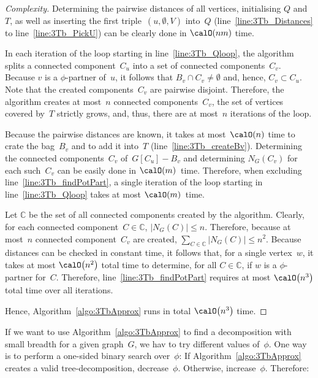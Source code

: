 \begin{proof}
    [Complexity]
Determining the pairwise distances of all vertices, initialising $Q$ and~$T$, as well as inserting the first triple~$(u, \emptyset, V)$ into~$Q$ (line~\ref{line:3Tb_Distances} to line~\ref{line:3Tb_PickU}) can be clearly done in $\calO(nm)$ time.

In each iteration of the loop starting in line~\ref{line:3Tb_Qloop}, the algorithm splits a connected component~$C_u$ into a set of connected components~$C_v$.
Because $v$ is a $\phi$-partner of~$u$, it follows that $B_v \cap C_v \neq \emptyset$ and, hence, $C_v \subset C_u$.
Note that the created components~$C_v$ are pairwise disjoint.
Therefore, the algorithm creates at most~$n$ connected components~$C_v$, the set of vertices covered by~$T$ strictly grows, and, thus, there are at most~$n$ iterations of the loop.

Because the pairwise distances are known, it takes at most~$\calO(n)$ time to crate the bag~$B_v$ and to add it into~$T$ (line~\ref{line:3Tb_createBv}).
Determining the connected components~$C_v$ of~$G[C_u] - B_v$ and determining $N_G(C_v)$ for each such~$C_v$ can be easily done in $\calO(m)$~time.
Therefore, when excluding line~\ref{line:3Tb_findPotPart}, a single iteration of the loop starting in line~\ref{line:3Tb_Qloop} takes at most $\calO(m)$~time.

Let $\mathbb{C}$ be the set of all connected components created by the algorithm.
Clearly, for each connected component~$C \in \mathbb{C}$, $|N_G(C)| \leq n$.
Therefore, because at most~$n$ connected component~$C_v$ are created, $\sum_{C \in \mathbb{C}} |N_G(C)| \leq n^2$.
Because distances can be checked in constant time, it follows that, for a single vertex~$w$, it takes at most $\calO \big( n^2 \big)$ total time to determine, for all $C \in \mathbb{C}$, if $w$ is a $\phi$-partner for~$C$.
Therefore, line~\ref{line:3Tb_findPotPart} requires at most $\calO \big( n^3 \big)$ total time over all iterations.

Hence, Algorithm~\ref{algo:3TbApprox} runs in total $\calO \big( n^3 \big)$ time.
\end{proof}

If we want to use Algorithm~\ref{algo:3TbApprox} to find a decomposition with small breadth for a given graph~$G$, we hav to try different values of~$\phi$.
One way is to perform a one-sided binary search over~$\phi$:
If Algorithm~\ref{algo:3TbApprox} creates a valid tree-decomposition, decrease~$\phi$.
Otherwise, increase~$\phi$.
Therefore:


